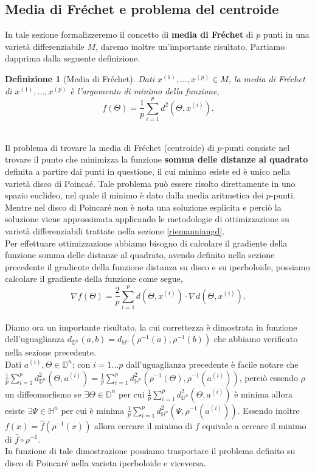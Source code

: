 \documentclass[a4paper, 12pt]{article}
\newtheorem{definition}{Definizione}
\begin{document}
\subsection{Media di Fréchet e problema del centroide}
In tale sezione formalizzeremo il concetto di \textbf{media di Fréchet} di $p$ punti in una varietà differenziabile $M$, daremo inoltre un'importante risultato. Partiamo dapprima dalla seguente definizione.
\begin{definition}[Media di Fréchet]
Dati $x^{(1)}, ..., x^{(p)} \in M$, la media di Fréchet di $x^{(1)}, ..., x^{(p)}$ è l'argomento di minimo della funzione,\\
\[f(\Theta) = \frac{1}{p}\sum_{i=1}^p d^2(\Theta, x^{(i)}).\]\\
\end{definition}
Il problema di trovare la media di Fréchet (centroide) di $p$-punti consiste nel trovare il punto che minimizza la funzione \textbf{somma delle distanze al quadrato} definita a partire dai punti in questione, il cui minimo esiste ed è unico nella varietà disco di Poincaé. Tale problema può essere risolto direttamente in uno spazio euclideo, nel quale il minimo è dato dalla media aritmetica dei $p$-punti. Mentre nel disco di Poincaré non è nota una soluzione esplicita e perciò la soluzione viene approssimata applicando le metodologie di ottimizzazione su varietà differenziabili trattate nella sezione \ref{riemanniangd}.\\
Per effettuare ottimizzazione abbiamo bisogno di calcolare il gradiente della funzione somma delle distanze al quadrato, avendo definito nella sezione precedente il gradiente della funzione distanza su disco e su iperboloide, possiamo calcolare il gradiente della funzione come segue,\\
\[\nabla f(\Theta) = \frac{2}{p} \sum_{i=1}^p d(\Theta, x^{(i)}) \cdot \nabla d(\Theta, x^{(i)}).\]\\
Diamo ora un importante risultato, la cui correttezza è dimostrata in funzione dell'uguaglianza $d_{\mathbb{D}^n}(a, b) = d_{\mathbb{H}^n}(\rho^{-1}(a), \rho^{-1}(b))$ che abbiamo verificato nella sezione precedente.\\
Dati $a^{(i)}, \Theta \in \mathbb{D}^n$; con $i = 1...p$ dall'uguaglianza precedente è facile notare che $\frac{1}{p}\sum_{i=1}^p d_{\mathbb{D}^n}^2(\Theta, a^{(i)}) = \frac{1}{p}\sum_{i=1}^p d_{\mathbb{H}^n}^2(\rho^{-1}(\Theta), \rho^{-1}(a^{(i)}))$, perciò essendo $\rho$ un diffeomorfismo se $\exists \Theta \in \mathbb{D}^n$ per cui $\frac{1}{p}\sum_{i=1}^p d_{\mathbb{D}^n}^2(\Theta, a^{(i)})$ è minima allora esiste $\exists \Psi \in \mathbb{H}^n$ per cui è minima $\frac{1}{p}\sum_{i=1}^p d_{\mathbb{H}^n}^2(\Psi, \rho^{-1}(a^{(i)}))$. Essendo inoltre $f(x) = \hat{f}(\rho^{-1}(x))$ allora cercare il minimo di $f$ equivale a cercare il minimo di $\hat{f} \circ \rho^{-1}$.\\
In funzione di tale dimostrazione possiamo trasportare il problema definito su disco di Poincaré nella varieta iperboloide e viceversa.
\end{document}
